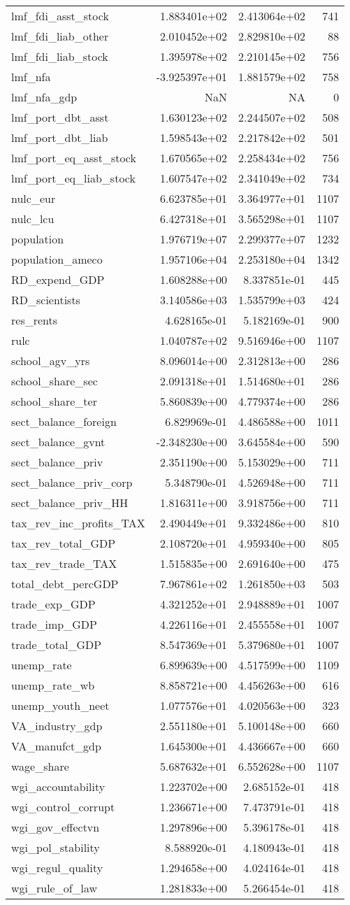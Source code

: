 \documentclass[]{article}
\begin{document}
\begin{longtable}[]{@{}lrrr@{}}
lmf\_fdi\_asst\_stock & 1.883401e+02 & 2.413064e+02 & 741\tabularnewline
lmf\_fdi\_liab\_other & 2.010452e+02 & 2.829810e+02 & 88\tabularnewline
lmf\_fdi\_liab\_stock & 1.395978e+02 & 2.210145e+02 & 756\tabularnewline
lmf\_nfa & -3.925397e+01 & 1.881579e+02 & 758\tabularnewline
lmf\_nfa\_gdp & NaN & NA & 0\tabularnewline
lmf\_port\_dbt\_asst & 1.630123e+02 & 2.244507e+02 & 508\tabularnewline
lmf\_port\_dbt\_liab & 1.598543e+02 & 2.217842e+02 & 501\tabularnewline
lmf\_port\_eq\_asst\_stock & 1.670565e+02 & 2.258434e+02 &
756\tabularnewline
lmf\_port\_eq\_liab\_stock & 1.607547e+02 & 2.341049e+02 &
734\tabularnewline
nulc\_eur & 6.623785e+01 & 3.364977e+01 & 1107\tabularnewline
nulc\_lcu & 6.427318e+01 & 3.565298e+01 & 1107\tabularnewline
population & 1.976719e+07 & 2.299377e+07 & 1232\tabularnewline
population\_ameco & 1.957106e+04 & 2.253180e+04 & 1342\tabularnewline
RD\_expend\_GDP & 1.608288e+00 & 8.337851e-01 & 445\tabularnewline
RD\_scientists & 3.140586e+03 & 1.535799e+03 & 424\tabularnewline
res\_rents & 4.628165e-01 & 5.182169e-01 & 900\tabularnewline
rulc & 1.040787e+02 & 9.516946e+00 & 1107\tabularnewline
school\_agv\_yrs & 8.096014e+00 & 2.312813e+00 & 286\tabularnewline
school\_share\_sec & 2.091318e+01 & 1.514680e+01 & 286\tabularnewline
school\_share\_ter & 5.860839e+00 & 4.779374e+00 & 286\tabularnewline
sect\_balance\_foreign & 6.829969e-01 & 4.486588e+00 &
1011\tabularnewline
sect\_balance\_gvnt & -2.348230e+00 & 3.645584e+00 & 590\tabularnewline
sect\_balance\_priv & 2.351190e+00 & 5.153029e+00 & 711\tabularnewline
sect\_balance\_priv\_corp & 5.348790e-01 & 4.526948e+00 &
711\tabularnewline
sect\_balance\_priv\_HH & 1.816311e+00 & 3.918756e+00 &
711\tabularnewline
tax\_rev\_inc\_profits\_TAX & 2.490449e+01 & 9.332486e+00 &
810\tabularnewline
tax\_rev\_total\_GDP & 2.108720e+01 & 4.959340e+00 & 805\tabularnewline
tax\_rev\_trade\_TAX & 1.515835e+00 & 2.691640e+00 & 475\tabularnewline
total\_debt\_percGDP & 7.967861e+02 & 1.261850e+03 & 503\tabularnewline
trade\_exp\_GDP & 4.321252e+01 & 2.948889e+01 & 1007\tabularnewline
trade\_imp\_GDP & 4.226116e+01 & 2.455558e+01 & 1007\tabularnewline
trade\_total\_GDP & 8.547369e+01 & 5.379680e+01 & 1007\tabularnewline
unemp\_rate & 6.899639e+00 & 4.517599e+00 & 1109\tabularnewline
unemp\_rate\_wb & 8.858721e+00 & 4.456263e+00 & 616\tabularnewline
unemp\_youth\_neet & 1.077576e+01 & 4.020563e+00 & 323\tabularnewline
VA\_industry\_gdp & 2.551180e+01 & 5.100148e+00 & 660\tabularnewline
VA\_manufct\_gdp & 1.645300e+01 & 4.436667e+00 & 660\tabularnewline
wage\_share & 5.687632e+01 & 6.552628e+00 & 1107\tabularnewline
wgi\_accountability & 1.223702e+00 & 2.685152e-01 & 418\tabularnewline
wgi\_control\_corrupt & 1.236671e+00 & 7.473791e-01 & 418\tabularnewline
wgi\_gov\_effectvn & 1.297896e+00 & 5.396178e-01 & 418\tabularnewline
wgi\_pol\_stability & 8.588920e-01 & 4.180943e-01 & 418\tabularnewline
wgi\_regul\_quality & 1.294658e+00 & 4.024164e-01 & 418\tabularnewline
wgi\_rule\_of\_law & 1.281833e+00 & 5.266454e-01 & 418\tabularnewline
\bottomrule
\end{longtable}
\end{document}
